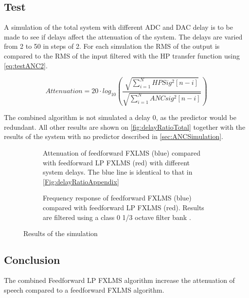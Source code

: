 \subsection{Test}
A simulation of the total system with different ADC and DAC delay is to be made to see if delays affect the attenuation of the system. The delays are varied from 2 to 50 in steps of 2. For each simulation the RMS of the output is compared to the RMS of the input filtered with the HP transfer function using \autoref{eq:testANC2}. 

\begin{equation}\label{eq:testANC2}
	Attenuation=20 \cdot log_{10} \left (\frac{\sqrt{\sum\limits_{i=1}^{N}HPSig^2[n-i]}}{\sqrt{\sum\limits_{i=1}^{N}ANCsig^2[n-i]}}  \right )
\end{equation}

The combined algorithm is not simulated a delay 0, as the predictor would be redundant. All other results are shown on \autoref{fig:delayRatioTotal} together with the results of the system with no predictor described in \autoref{sec:ANCSimulation}.
\begin{figure}[H]
	\centering
		\hspace{-20mm}
	\begin{subfigure}[b]{0.40\textwidth}
	\centering
		
		\caption{ Attenuation of feedforward FXLMS (blue) compared with feedforward LP FXLMS (red) with different system delays. The blue line is identical to that in \autoref{Fig:delayRatioAppendix}}
		\label{fig:delayRatioTotal}
	\end{subfigure}
	\hspace{20mm}
	\begin{subfigure}[b]{0.40\textwidth}
	\centering
	
	\caption{Frequency response of feedforward FXLMS (blue) compared with feedforward LP FXLMS (red). Results are filtered using a class 0 1/3 octave filter bank \cite{OctaveBand}.}
	\label{fig:ANCcompareALLAppendix}
	\end{subfigure}	
	\caption{Results of the simulation}	
\end{figure}



\subsection{Conclusion}
The combined Feedforward LP FXLMS algorithm increase the attenuation of speech compared to a feedforward FXLMS algorithm. 
